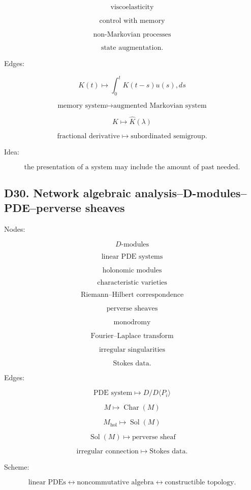 \documentclass[11pt]{article}
\begin{document}
\[
\text{viscoelasticity}
\]

\[
\text{control with memory}
\]

\[
\text{non-Markovian processes}
\]

\[
\text{state augmentation}.
\]

Edges:

\[
K(t)\mapsto \int_0^t K(t-s)u(s),ds
\]

\[
\text{memory system}\mapsto \text{augmented Markovian system}
\]

\[
K\mapsto \widehat K(\lambda)
\]

\[
\text{fractional derivative}\mapsto \text{subordinated semigroup}.
\]

Idea:

\[
\text{the presentation of a system may include the amount of past needed}.
\]



\subsection{D30. Network algebraic analysis--D-modules--PDE--perverse sheaves}

Nodes:

\[
D\text{-modules}
\]

\[
\text{linear PDE systems}
\]

\[
\text{holonomic modules}
\]

\[
\text{characteristic varieties}
\]

\[
\text{Riemann--Hilbert correspondence}
\]

\[
\text{perverse sheaves}
\]

\[
\text{monodromy}
\]

\[
\text{Fourier--Laplace transform}
\]

\[
\text{irregular singularities}
\]

\[
\text{Stokes data}.
\]

Edges:

\[
\text{PDE system}\mapsto D/D\langle P_i\rangle
\]

\[
M\mapsto \operatorname{Char}(M)
\]

\[
M_{\mathrm{hol}}\mapsto \operatorname{Sol}(M)
\]

\[
\operatorname{Sol}(M)\mapsto \text{perverse sheaf}
\]

\[
\text{irregular connection}\mapsto \text{Stokes data}.
\]

Scheme:

\[
\text{linear PDEs}
\leftrightarrow
\text{noncommutative algebra}
\leftrightarrow
\text{constructible topology}.
\]
\end{document}
